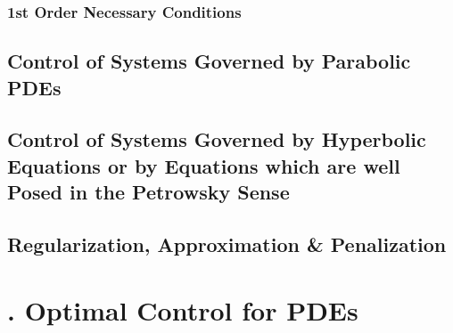 \documentclass[oneside]{book}
\numberwithin{equation}{section}
\begin{document}
\subsection{1st Order Necessary Conditions}

\section{Control of Systems Governed by Parabolic PDEs}

\section{Control of Systems Governed by Hyperbolic Equations or by Equations which are well Posed in the Petrowsky Sense}

\section{Regularization, Approximation \& Penalization}


\chapter{\cite{Troltzsch2010}. Optimal Control for PDEs}
\end{document}

